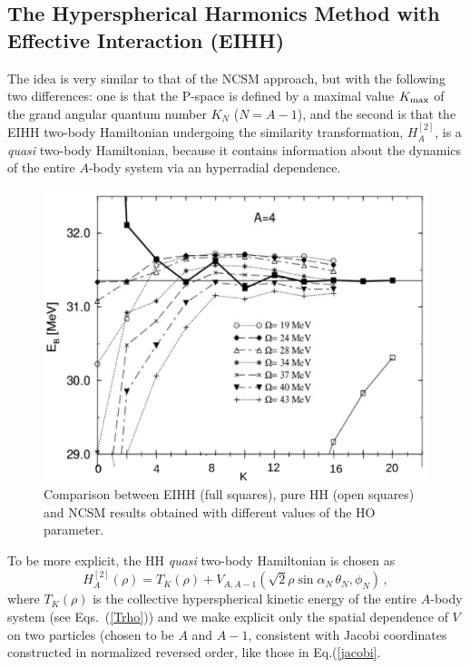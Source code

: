 \subsection{The Hyperspherical Harmonics Method with Effective Interaction (EIHH)}\label{sec:EIHH}

The idea is very similar to that of the NCSM approach, but with the following two differences:
one is that the P-space is defined by a maximal value $K_{\rm max}$ of the 
grand angular quantum number $K_N$ ($N=A-1$), and the second is that 
the EIHH two-body Hamiltonian  undergoing the similarity transformation, $H_A^{[2]}$, is a {\it quasi} 
two-body Hamiltonian, because it  contains information about the dynamics of the entire $A$-body system via an hyperradial dependence. 
\begin{figure}
\sidecaption
\includegraphics[scale=.35]{Chapter7-figures/fig2.eps}
%
%
\caption{Comparison between EIHH (full squares), pure HH 
(open squares)  and NCSM results obtained with different values of the HO
parameter.}
\label{fig:2}       %
\end{figure}

To be more explicit, the HH {\it quasi} two-body Hamiltonian is chosen as  
\begin{equation}
\label{H_quasi}
 H^{[2]}_A(\rho)= T_K(\rho) + V_{A,A-1}(\sqrt{2}\rho \sin{\alpha_N} \, \theta_N,\phi_N)\,,
\end{equation} 
where $T_K(\rho)$ is the collective hyperspherical kinetic energy of the entire $A$-body system 
(see Eqs.~(\ref{Trho})) and we make explicit only the spatial dependence of $V$ on two particles 
(chosen to be $A$ and $A-1$, consistent with  Jacobi coordinates constructed  in normalized reversed order, like those
in Eq.(\ref{jacobi}. 

